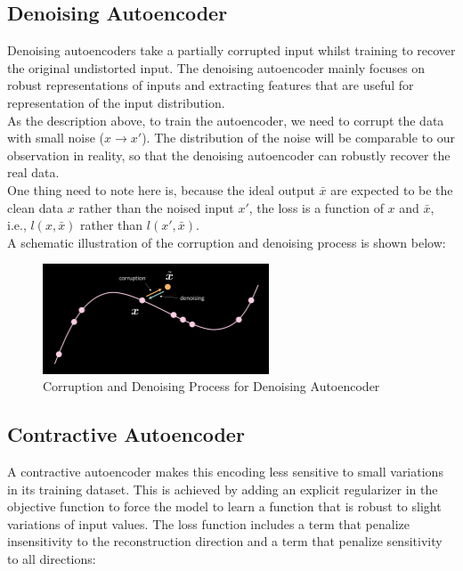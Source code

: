 \subsection{Denoising Autoencoder}

Denoising autoencoders take a partially corrupted input whilst training to recover the original undistorted input. The denoising autoencoder mainly focuses on robust representations of inputs and extracting features that are useful for representation of the input distribution.
\\
As the description above, to train the autoencoder, we need to corrupt the data with small noise ($x \rightarrow x'$). The distribution of the noise will be comparable to our observation in reality, so that the denoising autoencoder can robustly recover the real data.
\\One thing need to note here is, because the ideal output $\bar{x}$ are expected to be the clean data $x$ rather than the noised input $x'$, the loss is a function of $x$ and $\bar{x}$, i.e., $l(x,\bar{x})$ rather than $l(x',\bar{x})$.
\\
A schematic illustration of the corruption and denoising process is shown below:
\\
\begin{figure}[htb]
    \centering
    \includegraphics[width=0.6\textwidth]{labs/10/images/Corrpution_and_Denoising.png}
    \caption{Corruption and Denoising Process for Denoising Autoencoder}
    \label{fig:Corrpution_and_Denoising}
\end{figure}

\subsection{Contractive Autoencoder}

A contractive autoencoder makes this encoding less sensitive to small variations in its training dataset. This is achieved by adding an explicit regularizer in the objective function to force the model to learn a function that is robust to slight variations of input values. The loss function includes a term that penalize insensitivity to the reconstruction direction and a term that penalize sensitivity to all directions:

